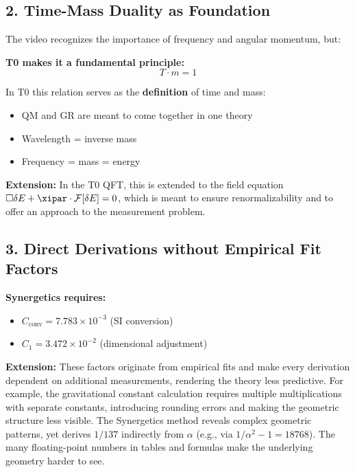 	\subsection{2. Time-Mass Duality as Foundation}
	
	The video recognizes the importance of frequency and angular momentum, but:
	
	\begin{vorteil}
		\textbf{T0 makes it a fundamental principle:}
		\begin{equation}
			\boxed{T \cdot m = 1}
		\end{equation}
		
		In T0 this relation serves as the \textbf{definition} of time and mass:
		\begin{itemize}
			\item QM and GR are meant to come together in one theory
			\item Wavelength = inverse mass
			\item Frequency = mass = energy
		\end{itemize}
		
		\textbf{Extension:} In the T0 QFT, this is extended to the field equation $\square \delta E + \xipar \cdot \mathcal{F}[\delta E] = 0$, which is meant to ensure renormalizability and to offer an approach to the measurement problem.
	\end{vorteil}
	
	\subsection{3. Direct Derivations without Empirical Fit Factors}
	
	\textbf{Synergetics requires:}
	\begin{itemize}
		\item $C_{\text{conv}} = 7.783 \times 10^{-3}$ (SI conversion)
		\item $C_1 = 3.472 \times 10^{-2}$ (dimensional adjustment)
	\end{itemize}
	
	\textbf{Extension:} These factors originate from empirical fits and make every derivation dependent on additional measurements, rendering the theory less predictive. For example, the gravitational constant calculation requires multiple multiplications with separate constants, introducing rounding errors and making the geometric structure less visible. The Synergetics method reveals complex geometric patterns, yet derives $1/137$ indirectly from $\alpha$ (e.g., via $1/\alpha^2 - 1 = 18768$). The many floating-point numbers in tables and formulas make the underlying geometry harder to see.
	
